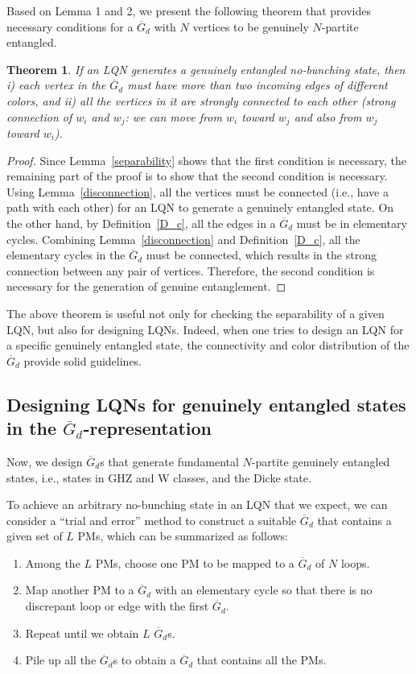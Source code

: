 \documentclass[a4paper,twocolumn,8pt,accepted=2021-12-15]{quantumarticle}
\newtheorem{theorem}{Theorem}
\def\dc{{\overline{G}_d }}
\begin{document}
	Based on Lemma 1 and 2, we present the following theorem that provides necessary conditions for a $\dc$ with $N$ vertices to be genuinely $N$-partite entangled. 
	\begin{theorem}\label{genuine_ent}
		If an LQN generates a genuinely entangled no-bunching state, then i) each vertex in the $\dc$ must have more than two incoming edges of different colors, and ii) all the vertices in it are strongly connected to each other (strong connection of $w_i$ and $w_j$: we can move from $w_i$ toward $w_j$ and also from $w_j$ toward $w_i$). 
	\end{theorem}	
	\begin{proof}
		Since Lemma~\ref{separability} shows that the first condition is necessary, the remaining part of the proof is to show that the second condition is necessary. Using Lemma~\ref{disconnection}, all the vertices must be connected (i.e., have a path with each other) for an LQN to generate a genuinely entangled state. On the other hand, by Definition~\ref{D_c}, all the edges in a $\dc$ must be in elementary cycles. Combining Lemma~\ref{disconnection} and Definition~\ref{D_c}, all the elementary cycles in the $\dc$ must be connected, which results in the strong connection between any pair of vertices. Therefore, the second condition is necessary for the generation of genuine entanglement.    
	\end{proof}
	
	The above theorem is useful not only for checking the separability of a given LQN, but also for designing LQNs. Indeed, when one tries to design an LQN for a specific genuinely entangled state, the connectivity and color distribution of the $\dc$ provide solid guidelines.
		
		
	\subsection{Designing LQNs for genuinely entangled states in the $\dc$-representation}\label{applications}
	
	Now, we design $\dc$s that generate fundamental $N$-partite genuinely entangled states, i.e., states in GHZ and W classes, and the Dicke state.
	
	To achieve an arbitrary no-bunching state in an LQN that we expect, we can consider a ``trial and error'' method to construct a suitable $\dc$ that contains a given set of $L$ PMs, which can be summarized as follows:
	
	\begin{enumerate}
		\item 
		Among the $L$ PMs, choose one PM to be mapped to a $\dc$ of $N$ loops. 
		\item 
		Map another PM to a $\dc$ with an elementary cycle so that there is no discrepant loop or edge with the first $\dc$.
		\item
		Repeat until we obtain $L$ $\dc$s.
		\item 
		Pile up all the $\dc$s to obtain a $\dc$ that contains all the PMs. 
	\end{enumerate}
	
\end{document}
